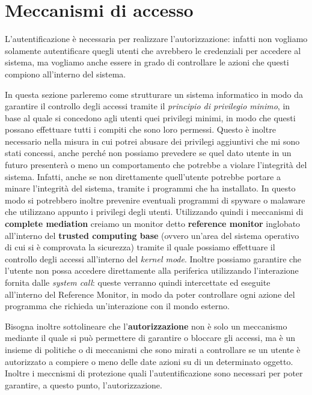 \chapter{Meccanismi di accesso}
L'autentificazione è necessaria per realizzare l'autorizzazione: infatti non
vogliamo solamente autentificare quegli utenti che avrebbero le credenziali per
accedere al sistema, ma vogliamo anche essere in grado di controllare le azioni
che questi compiono all'interno del sistema. 


In questa sezione parleremo come strutturare un sistema informatico in modo da
garantire il controllo degli accessi tramite il \textit{principio di privilegio 
minimo}, in base al quale si concedono agli utenti quei privilegi minimi, in
modo che questi possano effettuare tutti i compiti che sono loro permessi. Questo
è inoltre necessario nella misura in cui potrei abusare dei privilegi aggiuntivi
che mi sono stati concessi, anche perché non possiamo prevedere se quel dato
utente in un futuro presenterà o meno un comportamento che potrebbe a violare
l'integrità del sistema. Infatti, anche se non direttamente quell'utente potrebbe
portare a minare l'integrità del sistema, tramite i programmi
che ha installato. In questo modo si potrebbero inoltre prevenire eventuali
programmi di spyware o malaware che utilizzano appunto i privilegi degli utenti.
Utilizzando quindi i meccanismi di \textbf{complete mediation} creiamo un monitor
detto \textbf{reference monitor} inglobato all'interno del \textbf{trusted computing base}
(ovvero un'area del sistema operativo di cui si è comprovata la sicurezza)
tramite il quale possiamo effettuare il controllo  degli accessi all'interno del 
\textit{kernel mode}. Inoltre possiamo garantire che l'utente non possa accedere
direttamente alla periferica utilizzando l'interazione fornita dalle \textit{system
call}: queste verranno quindi intercettate ed eseguite all'interno del
Reference Monitor, in modo da poter controllare ogni azione del programma che
richieda un'interazione con il mondo esterno.


Bisogna inoltre sottolineare che l'\textbf{autorizzazione} non è solo un meccanismo 
mediante il quale si può permettere di garantire o bloccare gli accessi, ma è 
un insieme di politiche o di meccanismi che sono mirati a controllare se un 
utente è autorizzato a compiere o meno delle date azioni su di un determinato 
oggetto. Inoltre i meccnismi di protezione quali l'autentificazione sono 
necessari per poter garantire, a questo punto, l'autorizzazione.


